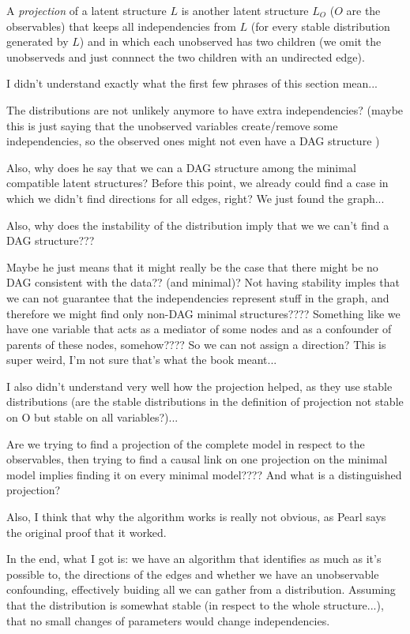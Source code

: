 A \textit{projection} of a latent structure $L$ is another latent structure $L_O$ ($O$ are the observables) that keeps all independencies from $L$ (for every stable distribution generated by $L$) and in which each unobserved has two children (we omit the unobserveds and just connnect the two children with an undirected edge).

I didn't understand exactly what the first few phrases of this section mean... 

The distributions are not unlikely anymore to have extra independencies? (maybe this is just saying that the unobserved variables create/remove some independencies, so the observed ones might not even have a DAG structure )

Also, why does he say that we can  a DAG structure among the minimal compatible latent structures? Before this point, we already could find a case in which we didn't find directions for all edges, right? We just found the  graph...

Also, why does the instability of the distribution imply that we we can't find a DAG structure???

Maybe he just means that it might really be the case that there might be no DAG consistent with the data?? (and minimal)? Not having stability imples that we can not guarantee that the independencies represent stuff in the graph, and therefore we might find only non-DAG minimal structures???? Something like we have one variable that acts as a mediator of some nodes and as a confounder of parents of these nodes, somehow???? So we can not assign a direction? This is super weird, I'm not sure that's what the book meant...

I also didn't understand very well how the projection helped, as they use stable distributions (are the stable distributions in the definition of projection not stable on O but stable on all variables?)...

Are we trying to find a projection of the complete model in respect to the observables, then trying to find a causal link on one projection on the minimal model implies finding it on every minimal model???? And what is a distinguished projection? 

Also, I think that why the algorithm works is really not obvious, as Pearl says the original proof that it worked.


In the end, what I got is: we have an algorithm that identifies as much as it's possible to, the directions of the edges and whether we have an unobservable confounding, effectively buiding all we can gather from a distribution. Assuming that the distribution is somewhat stable (in respect to the whole structure...), that no small changes of parameters would change independencies.


